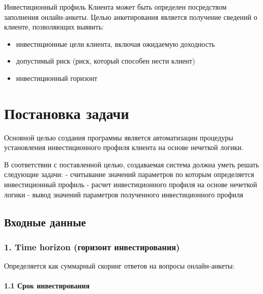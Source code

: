 \documentclass[11pt]{article}
\providecommand{\tightlist}{%
      \setlength{\itemsep}{0pt}\setlength{\parskip}{0pt}}
\begin{document}
Инвестиционный профиль Клиента может быть определен посредством
заполнения онлайн-анкеты. Целью анкетирования является получение
сведений о клиенте, позволяющих выявить:

\begin{itemize}
\tightlist
\item
  инвестиционные цели клиента, включая ожидаемую доходность
\item
  допустимый риск (риск, который способен нести клиент)
\item
  инвестиционный горизонт
\end{itemize}

\section{Постановка
задачи}\label{ux43fux43eux441ux442ux430ux43dux43eux432ux43aux430-ux437ux430ux434ux430ux447ux438}

Основной целью создания программы является автоматизации процедуры
установления инвестиционного профиля клиента на основе нечеткой логики.

В соответствии с поставленной целью, создаваемая система должна уметь
решать следующие задачи: - считывание значений параметров по которым
определяется инвестиционный профиль - расчет инвестиционного профиля на
основе нечеткой логики - вывод значений параметров полученного
инвестиционного профиля

\subsection{Входные
данные}\label{ux432ux445ux43eux434ux43dux44bux435-ux434ux430ux43dux43dux44bux435}

\subsubsection{1. Time horizon (горизонт
инвестирования)}\label{time-horizon-ux433ux43eux440ux438ux437ux43eux43dux442-ux438ux43dux432ux435ux441ux442ux438ux440ux43eux432ux430ux43dux438ux44f}

Определяется как суммарный скоринг ответов на вопросы онлайн-анкеты:

\paragraph{1.1 Срок
инвестирования}\label{ux441ux440ux43eux43a-ux438ux43dux432ux435ux441ux442ux438ux440ux43eux432ux430ux43dux438ux44f}
\end{document}
